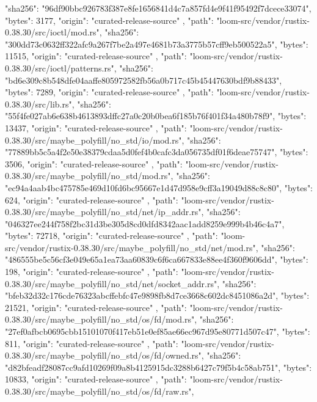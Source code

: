 {{      "sha256": "96df90bbc926783f387e8fe1656841d4c7a857fd4e9f41f95492f7dcece33074",
      "bytes": 3177,
      "origin": "curated-release-source"
    },
    {
      "path": "loom-src/vendor/rustix-0.38.30/src/ioctl/mod.rs",
      "sha256": "300dd73c0632ff322afc9a267f7be2a497e4681b73a3775b57cff9eb500522a5",
      "bytes": 11515,
      "origin": "curated-release-source"
    },
    {
      "path": "loom-src/vendor/rustix-0.38.30/src/ioctl/patterns.rs",
      "sha256": "bd6e309c8b548dfe04aaffe805972582fb56a0b717c45b45447630bdf9b88433",
      "bytes": 7289,
      "origin": "curated-release-source"
    },
    {
      "path": "loom-src/vendor/rustix-0.38.30/src/lib.rs",
      "sha256": "55f4fe027ab6e638b4613893dffc27a0c20b0bea6f185b76f401f34a480b78f9",
      "bytes": 13437,
      "origin": "curated-release-source"
    },
    {
      "path": "loom-src/vendor/rustix-0.38.30/src/maybe_polyfill/no_std/io/mod.rs",
      "sha256": "77889bb5c5a4f2e50e38379cdaa5d0fef4b0cafc3da056735df01f6deae75747",
      "bytes": 3506,
      "origin": "curated-release-source"
    },
    {
      "path": "loom-src/vendor/rustix-0.38.30/src/maybe_polyfill/no_std/mod.rs",
      "sha256": "ec94a4aab4bc475785e469d10fd6bc95667e1d47d958e9cff3a19049d88c8c80",
      "bytes": 624,
      "origin": "curated-release-source"
    },
    {
      "path": "loom-src/vendor/rustix-0.38.30/src/maybe_polyfill/no_std/net/ip_addr.rs",
      "sha256": "046327ee244f758f2bc31d3be305d8cd0dfd8342aac1add8259e999b4b46c4a7",
      "bytes": 72718,
      "origin": "curated-release-source"
    },
    {
      "path": "loom-src/vendor/rustix-0.38.30/src/maybe_polyfill/no_std/net/mod.rs",
      "sha256": "486555be5c56cf3e049e65a1ea73aa60839c6f6ca667833e88ee4f360f9606dd",
      "bytes": 198,
      "origin": "curated-release-source"
    },
    {
      "path": "loom-src/vendor/rustix-0.38.30/src/maybe_polyfill/no_std/net/socket_addr.rs",
      "sha256": "bfeb32d32c176cde76323abcffebfc47e9898fb8d7ce3668c602dc8451086a2d",
      "bytes": 21521,
      "origin": "curated-release-source"
    },
    {
      "path": "loom-src/vendor/rustix-0.38.30/src/maybe_polyfill/no_std/os/fd/mod.rs",
      "sha256": "27ef0afbcb0695cbb15101070f417eb51e0ef85ae66ec967d95e80771d507c47",
      "bytes": 811,
      "origin": "curated-release-source"
    },
    {
      "path": "loom-src/vendor/rustix-0.38.30/src/maybe_polyfill/no_std/os/fd/owned.rs",
      "sha256": "d82bfeadf28087cc9afd10269f09a8b4125915dc3288b6427c79f5b4c58ab751",
      "bytes": 10833,
      "origin": "curated-release-source"
    },
    {
      "path": "loom-src/vendor/rustix-0.38.30/src/maybe_polyfill/no_std/os/fd/raw.rs",
}}
